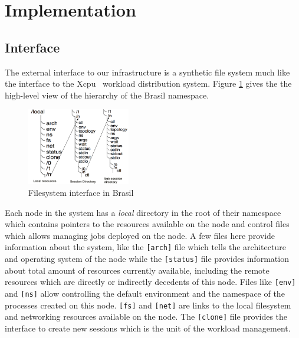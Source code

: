 \section{Implementation}

\subsection{Interface}

The external interface to our infrastructure is a synthetic file system
much like the interface to the Xcpu~\cite{xcpu} workload distribution
system.  
Figure \ref{fig:xcpu3Local} gives the the high-level view of the hierarchy 
of the Brasil namespace.

\begin{figure}[h]
  \begin{center}
    \leavevmode
      \includegraphics[height=0.25\textheight,width=0.4\textwidth]
		{./img/local_session_subsessions}
    \caption{Filesystem interface in Brasil}
    \label{fig:xcpu3Local}
  \end{center}
\end{figure}

Each node in the system has a \emph{local} directory in the root of their
namespace which contains pointers to the resources
available on the node and control files which allows managing 
jobs deployed on the node.
A few files here provide information about the system, like the
\texttt{[arch]} file which tells the architecture and operating system of 
the node while the \texttt{[status]} file provides information about total 
amount of resources currently available, including the remote resources which 
are directly or indirectly decedents of this node.  
Files like \texttt{[env]} and \texttt{[ns]}
allow controlling the default environment and the namespace of the processes
created on this node.  \texttt{[fs]} and \texttt{[net]} are links to the local
filesystem and networking resources available on the node.  The
\texttt{[clone]} file provides the interface to create new sessions which is
the unit of the workload management.

